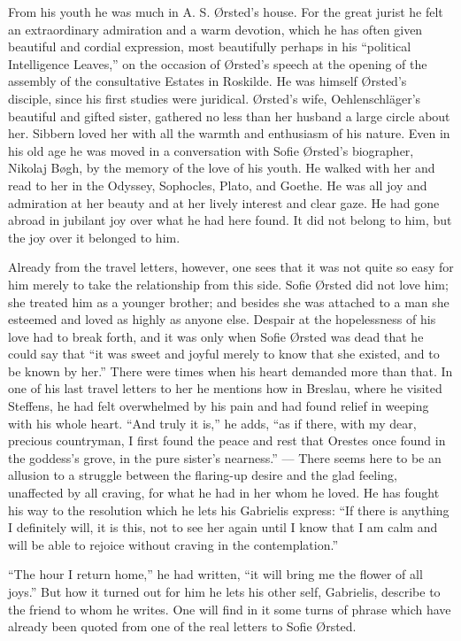 \documentclass[12pt,a4paper,openany]{book}
\newcommand{\opage}[1]{\marginnote{\footnotesize\textit{[#1]}}}
\begin{document}
From his youth he was much in A. S. Ørsted's house. For
the great jurist he felt an extraordinary admiration
and a warm devotion, which he has often given beautiful
and cordial expression, most beautifully perhaps in his ``political
Intelligence Leaves,'' on the occasion of Ørsted's speech at the opening
of the assembly of the consultative Estates in Roskilde. He
was himself Ørsted's disciple, since his first studies were
juridical. Ørsted's wife, Oehlenschläger's beautiful and gifted
sister, gathered no less than her husband a large circle
about her. Sibbern loved her with all the warmth and
enthusiasm of his nature. Even in his old age he was moved
in a conversation with Sofie Ørsted's biographer, Nikolaj Bøgh, by
the memory of the love of his youth. He walked with
her and read to her in the Odyssey, Sophocles, Plato, and
Goethe. He was all joy and admiration at her
beauty and at her lively interest and clear gaze.
He had gone abroad in jubilant joy over what he had here
found. It did not belong to him, but the joy over it
belonged to him.

Already from the travel letters, however, one sees that it was not
quite so easy for him merely to take the relationship from this side.
Sofie Ørsted did not love him; she treated him as a younger
brother; and besides she was attached to a man she esteemed
and loved as highly as anyone else. Despair at
the hopelessness of his love had to break forth, and it
was only when Sofie Ørsted was dead that he could say that
``it was sweet and joyful merely to know that she existed, and
\opage{66}to be known by her.'' There were times when his heart
demanded more than that. In one of his last travel letters to
her he mentions how in Breslau, where he
visited Steffens, he had felt overwhelmed by his pain and
had found relief in weeping with his whole heart. ``And
truly it is,'' he adds, ``as if there, with my
dear, precious countryman, I first found the peace and
rest that Orestes once found in the goddess's grove, in the pure
sister's nearness.'' --- There seems here to be an allusion to a
struggle between the flaring-up desire and the glad feeling, unaffected by all
craving, for what he had in her whom he
loved. He has fought his way to the resolution which
he lets his Gabrielis express: ``If there is anything I definitely
will, it is this, not to see her again until
I know that I am calm and will be able to rejoice without craving
in the contemplation.''

``The hour I return home,'' he had written, ``it
will bring me the flower of all joys.'' But how it
turned out for him he lets his other self, Gabrielis, describe to the
friend to whom he writes. One will find in it some
turns of phrase which have already been quoted from one of the real
letters to Sofie Ørsted.
\end{document}
